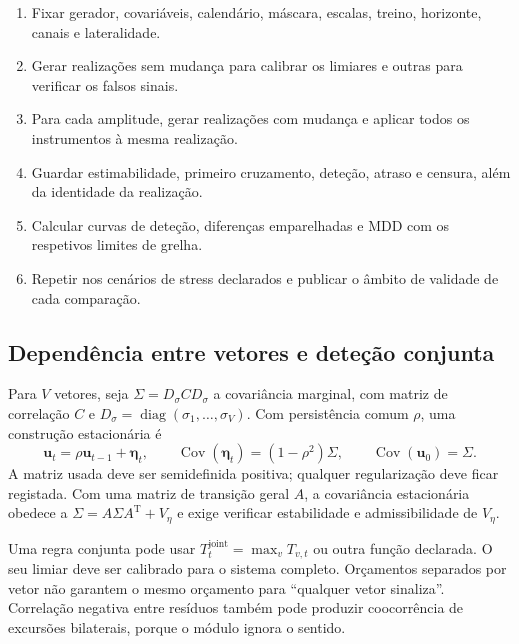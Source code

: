 \begin{tcolorbox}[colback=black!2,colframe=black!45,fontupper=\small,title={Algoritmo G.3 --- Avaliação com verdade conhecida}]
\begin{enumerate}[leftmargin=*,nosep]
\item Fixar gerador, covariáveis, calendário, máscara, escalas, treino, horizonte, canais e lateralidade.
\item Gerar realizações sem mudança para calibrar os limiares e outras para verificar os falsos sinais.
\item Para cada amplitude, gerar realizações com mudança e aplicar todos os instrumentos à mesma realização.
\item Guardar estimabilidade, primeiro cruzamento, deteção, atraso e censura, além da identidade da realização.
\item Calcular curvas de deteção, diferenças emparelhadas e MDD com os respetivos limites de grelha.
\item Repetir nos cenários de stress declarados e publicar o âmbito de validade de cada comparação.
\end{enumerate}
\end{tcolorbox}

\subsection{Dependência entre vetores e deteção conjunta}
\label{sec:mat-simulacao-conjunta}
Para $V$ vetores, seja $\Sigma=D_\sigma C D_\sigma$ a covariância marginal, com matriz de correlação $C$ e $D_\sigma=\operatorname{diag}(\sigma_1,\ldots,\sigma_V)$. Com persistência comum $\rho$, uma construção estacionária é
\begin{equation}
\boldsymbol u_t=\rho\boldsymbol u_{t-1}+\boldsymbol\eta_t,
\qquad \operatorname{Cov}(\boldsymbol\eta_t)=(1-\rho^2)\Sigma,
\qquad \operatorname{Cov}(\boldsymbol u_0)=\Sigma.
\label{eq:mat-ar-multivariado}
\end{equation}
A matriz usada deve ser semidefinida positiva; qualquer regularização deve ficar registada. Com uma matriz de transição geral $A$, a covariância estacionária obedece a $\Sigma=A\Sigma A^{\mathrm T}+V_\eta$ e exige verificar estabilidade e admissibilidade de $V_\eta$.

Uma regra conjunta pode usar $T_t^{\mathrm{joint}}=\max_vT_{v,t}$ ou outra função declarada. O seu limiar deve ser calibrado para o sistema completo. Orçamentos separados por vetor não garantem o mesmo orçamento para ``qualquer vetor sinaliza''. Correlação negativa entre resíduos também pode produzir coocorrência de excursões bilaterais, porque o módulo ignora o sentido.

